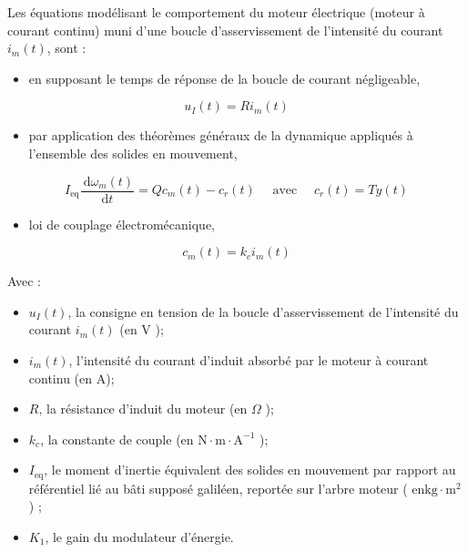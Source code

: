 Les équations modélisant le comportement du moteur électrique (moteur à courant continu) muni d'une boucle d'asservissement de l'intensité du courant $i_{m}(t)$, sont :

\begin{itemize}
  \item en supposant le temps de réponse de la boucle de courant négligeable,
\end{itemize}

$$
u_{I}(t)=R i_{m}(t)
$$

\begin{itemize}
  \item par application des théorèmes généraux de la dynamique appliqués à l'ensemble des solides en mouvement,
\end{itemize}

$$
I_{\mathrm{eq}} \frac{\mathrm{~d} \omega_{m}(t)}{\mathrm{d} t}=Q c_{m}(t)-c_{r}(t) \quad \text { avec } \quad c_{r}(t)=T y(t)
$$

\begin{itemize}
  \item loi de couplage électromécanique,
\end{itemize}

$$
c_{m}(t)=k_{c} i_{m}(t)
$$

Avec :

\begin{itemize}
  \item $u_{I}(t)$, la consigne en tension de la boucle d'asservissement de l'intensité du courant $i_{m}(t)$ (en V );
  \item $i_{m}(t)$, l'intensité du courant d'induit absorbé par le moteur à courant continu (en A);
  \item $R$, la résistance d'induit du moteur (en $\Omega$ );
  \item $k_{c}$, la constante de couple (en $\mathrm{N} \cdot \mathrm{m} \cdot \mathrm{A}^{-1}$ );
  \item $I_{\mathrm{eq}}$, le moment d'inertie équivalent des solides en mouvement par rapport au référentiel lié au bâti supposé galiléen, reportée sur l'arbre moteur ( $\mathrm{en} \mathrm{kg} \cdot \mathrm{m}^{2}$ ) ;
  \item $K_{1}$, le gain du modulateur d'énergie.
\end{itemize}



